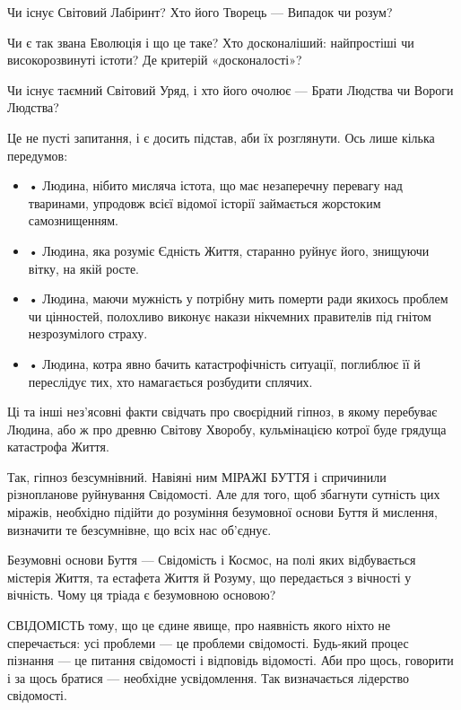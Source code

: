 Чи існує Світовий Лабіринт? Хто його Творець — Випадок чи розум?

Чи є так звана Еволюція і що це таке? Хто досконаліший: найпростіші чи
високорозвинуті істоти? Де критерій «досконалості»?

Чи існує таємний Світовий Уряд, і хто його очолює — Брати Людства чи Вороги
Людства?

Це не пусті запитання, і є досить підстав, аби їх розглянути. Ось лише кілька
передумов:

\begin{itemize}
	

\item • Людина, нібито мисляча істота, що має незаперечну перевагу над тваринами,
упродовж всієї відомої історії займається жорстоким самознищенням.

\item • Людина, яка розуміє Єдність Життя, старанно руйнує його, знищуючи вітку, на
якій росте.

\item • Людина, маючи мужність у потрібну мить померти ради якихось проблем чи
				цінностей, полохливо виконує накази нікчемних правителів під гнітом
								незрозумілого страху.

\item • Людина, котра явно бачить катастрофічність ситуації, поглиблює її й
				переслідує тих, хто намагається розбудити сплячих.

\end{itemize}

Ці та інші нез’ясовні факти свідчать про своєрідний гіпноз, в якому перебуває
Людина, або ж про древню Світову Хворобу, кульмінацією котрої буде грядуща
катастрофа Життя.

Так, гіпноз безсумнівний. Навіяні ним МІРАЖІ БУТТЯ і спричинили різнопланове
руйнування Свідомості. Але для того, щоб збагнути сутність цих міражів,
необхідно підійти до розуміння безумовної основи Буття й мислення, визначити те
безсумнівне, що всіх нас об’єднує.

Безумовні основи Буття — Свідомість і Космос, на полі яких відбувається
містерія Життя, та естафета Життя й Розуму, що передається з вічності у
вічність. Чому ця тріада є безумовною основою?

СВІДОМІСТЬ тому, що це єдине явище, про наявність якого ніхто не сперечається:
усі проблеми — це проблеми свідомості. Будь-який процес пізнання — це питання
свідомості і відповідь відомості. Аби про щось, говорити і за щось братися —
необхідне усвідомлення. Так визначається лідерство свідомості.

